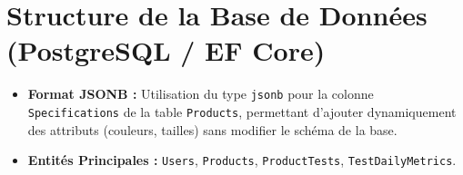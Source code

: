 \documentclass[11pt,a4paper]{article}
\begin{document}
\section{Structure de la Base de Données (PostgreSQL / EF Core)}
\begin{itemize}
    \item \textbf{Format JSONB :} Utilisation du type \texttt{jsonb} pour la colonne \texttt{Specifications} de la table \texttt{Products}, permettant d'ajouter dynamiquement des attributs (couleurs, tailles) sans modifier le schéma de la base.
    \item \textbf{Entités Principales :} \texttt{Users}, \texttt{Products}, \texttt{ProductTests}, \texttt{TestDailyMetrics}.
\end{itemize}
\end{document}

